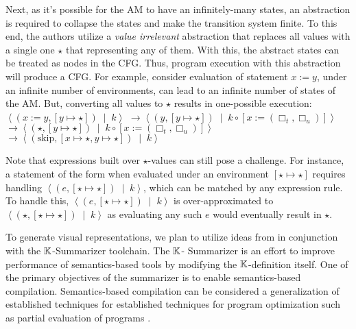Next, as it's possible for the AM to have an infinitely-many states, an
abstraction is required to collapse the states and make the transition system
finite. To this end, the authors utilize a \emph{value irrelevant} abstraction
that replaces all values with a single one $\star$ that representing any of
them. With this, the abstract states can be treated as nodes in the CFG.
Thus, program execution with this abstraction will produce a CFG.
For example, consider evaluation of statement $x := y$, under an
infinite number of environments, can lead to an infinite number of
states of the AM.
But, converting all values to $\star$ results in
one-possible execution: $\left\langle \left( x := y, \left[ y \mapsto \star
    \right] \right) \;\mid\; k \right\rangle$
$\rightarrow  \left\langle \left(y, \left[ y \mapsto \star \right] \right) \;\mid\; k \circ \left[ x := \left(\Box_t,\Box_u\right) \right] \right\rangle$
$\rightarrow  \left\langle \left(\star, \left[ y \mapsto \star \right] \right) \;\mid\; k \circ \left[ x := \left(\Box_t,\Box_u\right) \right] \right\rangle$
$\rightarrow  \left\langle \left(\text{skip}, \left[x \mapsto \star, y \mapsto \star \right] \right) \;\mid\; k \right\rangle$

Note that expressions built over $\star$-values can still pose a
challenge. For instance, a statement of the form  when
evaluated under an environment $\left[\star \mapsto \star\right]$ requires
handling $\left\langle \left(e, \left[ \star \mapsto \star \right] \right)\;\mid\; k
\right\rangle$, which can be matched by any expression rule. To handle this,
$\left\langle \left(e, \left[ \star \mapsto \star \right] \right)\;\mid\; k \right\rangle$
is over-approximated to $\left \langle \left(\star, \left[ \star \mapsto \star \right] \right)\;\mid\; k \right\rangle$
as evaluating any such $e$ would eventually result in $\star$.



To generate visual representations, we plan to utilize ideas from \cite{KoppelICFP22}
in conjunction with the $\mathbb{K}{}$-Summarizer toolchain. The $\mathbb{K}{}$-
Summarizer is an effort to improve performance of semantics-based tools
by modifying the $\mathbb{K}$-definition itself. One of the primary objectives
of the summarizer is to enable semantics-based compilation.
Semantics-based compilation can be considered a generalization of
established techniques for established techniques for program optimization
such as partial evaluation of programs \cite{Jones93Book}.

